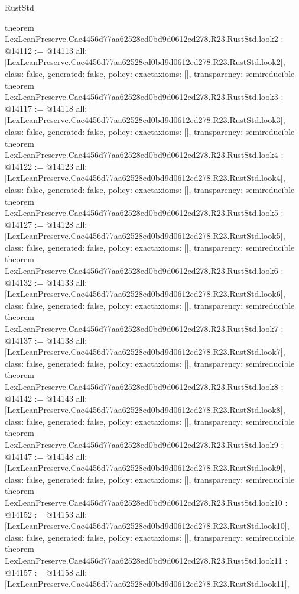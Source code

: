 \begin{lexlean}{RustStd}
\begin{coremodule}
{}
theorem LexLeanPreserve.Cae4456d77aa62528ed0bd9d0612cd278.R23.RustStd.look2 : @14112 := @14113 {
  all: [LexLeanPreserve.Cae4456d77aa62528ed0bd9d0612cd278.R23.RustStd.look2],
  class: false,
  generated: false,
  policy: exact{axioms: []},
  transparency: semireducible
}
theorem LexLeanPreserve.Cae4456d77aa62528ed0bd9d0612cd278.R23.RustStd.look3 : @14117 := @14118 {
  all: [LexLeanPreserve.Cae4456d77aa62528ed0bd9d0612cd278.R23.RustStd.look3],
  class: false,
  generated: false,
  policy: exact{axioms: []},
  transparency: semireducible
}
theorem LexLeanPreserve.Cae4456d77aa62528ed0bd9d0612cd278.R23.RustStd.look4 : @14122 := @14123 {
  all: [LexLeanPreserve.Cae4456d77aa62528ed0bd9d0612cd278.R23.RustStd.look4],
  class: false,
  generated: false,
  policy: exact{axioms: []},
  transparency: semireducible
}
theorem LexLeanPreserve.Cae4456d77aa62528ed0bd9d0612cd278.R23.RustStd.look5 : @14127 := @14128 {
  all: [LexLeanPreserve.Cae4456d77aa62528ed0bd9d0612cd278.R23.RustStd.look5],
  class: false,
  generated: false,
  policy: exact{axioms: []},
  transparency: semireducible
}
theorem LexLeanPreserve.Cae4456d77aa62528ed0bd9d0612cd278.R23.RustStd.look6 : @14132 := @14133 {
  all: [LexLeanPreserve.Cae4456d77aa62528ed0bd9d0612cd278.R23.RustStd.look6],
  class: false,
  generated: false,
  policy: exact{axioms: []},
  transparency: semireducible
}
theorem LexLeanPreserve.Cae4456d77aa62528ed0bd9d0612cd278.R23.RustStd.look7 : @14137 := @14138 {
  all: [LexLeanPreserve.Cae4456d77aa62528ed0bd9d0612cd278.R23.RustStd.look7],
  class: false,
  generated: false,
  policy: exact{axioms: []},
  transparency: semireducible
}
theorem LexLeanPreserve.Cae4456d77aa62528ed0bd9d0612cd278.R23.RustStd.look8 : @14142 := @14143 {
  all: [LexLeanPreserve.Cae4456d77aa62528ed0bd9d0612cd278.R23.RustStd.look8],
  class: false,
  generated: false,
  policy: exact{axioms: []},
  transparency: semireducible
}
theorem LexLeanPreserve.Cae4456d77aa62528ed0bd9d0612cd278.R23.RustStd.look9 : @14147 := @14148 {
  all: [LexLeanPreserve.Cae4456d77aa62528ed0bd9d0612cd278.R23.RustStd.look9],
  class: false,
  generated: false,
  policy: exact{axioms: []},
  transparency: semireducible
}
theorem LexLeanPreserve.Cae4456d77aa62528ed0bd9d0612cd278.R23.RustStd.look10 : @14152 := @14153 {
  all: [LexLeanPreserve.Cae4456d77aa62528ed0bd9d0612cd278.R23.RustStd.look10],
  class: false,
  generated: false,
  policy: exact{axioms: []},
  transparency: semireducible
}
theorem LexLeanPreserve.Cae4456d77aa62528ed0bd9d0612cd278.R23.RustStd.look11 : @14157 := @14158 {
  all: [LexLeanPreserve.Cae4456d77aa62528ed0bd9d0612cd278.R23.RustStd.look11],
}
\end{coremodule}
\end{lexlean}
